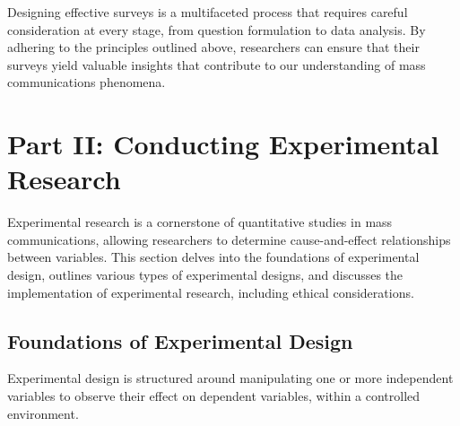 \documentclass[
]{book}
\begin{document}
Designing effective surveys is a multifaceted process that requires careful consideration at every stage, from question formulation to data analysis. By adhering to the principles outlined above, researchers can ensure that their surveys yield valuable insights that contribute to our understanding of mass communications phenomena.

\hypertarget{part-ii-conducting-experimental-research}{%
\section{Part II: Conducting Experimental Research}\label{part-ii-conducting-experimental-research}}

Experimental research is a cornerstone of quantitative studies in mass communications, allowing researchers to determine cause-and-effect relationships between variables. This section delves into the foundations of experimental design, outlines various types of experimental designs, and discusses the implementation of experimental research, including ethical considerations.

\hypertarget{foundations-of-experimental-design}{%
\subsection*{Foundations of Experimental Design}\label{foundations-of-experimental-design}}

Experimental design is structured around manipulating one or more independent variables to observe their effect on dependent variables, within a controlled environment.
\end{document}
